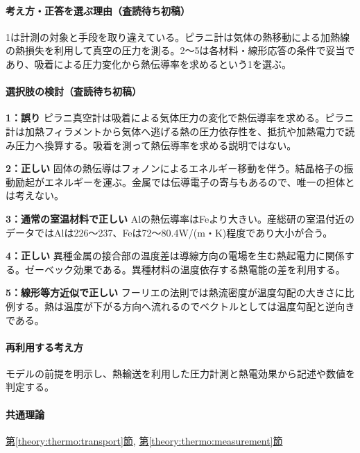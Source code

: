 \paragraph{考え方・正答を選ぶ理由（査読待ち初稿）} 1は計測の対象と手段を取り違えている。ピラニ計は気体の熱移動による加熱線の熱損失を利用して真空の圧力を測る。2〜5は各材料・線形応答の条件で妥当であり、吸着による圧力変化から熱伝導率を求めるという1を選ぶ。

\paragraph{選択肢の検討（査読待ち初稿）}\mbox{}\par

\noindent\textbf{1：誤り} ピラニ真空計は吸着による気体圧力の変化で熱伝導率を求める。ピラニ計は加熱フィラメントから気体へ逃げる熱の圧力依存性を、抵抗や加熱電力で読み圧力へ換算する。吸着を測って熱伝導率を求める説明ではない。\par

\noindent\textbf{2：正しい} 固体の熱伝導はフォノンによるエネルギー移動を伴う。結晶格子の振動励起がエネルギーを運ぶ。金属では伝導電子の寄与もあるので、唯一の担体とは考えない。\par

\noindent\textbf{3：通常の室温材料で正しい} Alの熱伝導率はFeより大きい。産総研の室温付近のデータではAlは226〜237、Feは72〜80.4W/(m・K)程度であり大小が合う。\par

\noindent\textbf{4：正しい} 異種金属の接合部の温度差は導線方向の電場を生む熱起電力に関係する。ゼーベック効果である。異種材料の温度依存する熱電能の差を利用する。\par

\noindent\textbf{5：線形等方近似で正しい} フーリエの法則では熱流密度が温度勾配の大きさに比例する。熱は温度が下がる方向へ流れるのでベクトルとしては温度勾配と逆向きである。\par

\paragraph{再利用する考え方} モデルの前提を明示し、熱輸送を利用した圧力計測と熱電効果から記述や数値を判定する。

\paragraph{共通理論} \hyperref[theory:thermo:transport]{第\ref*{theory:thermo:transport}節}, \hyperref[theory:thermo:measurement]{第\ref*{theory:thermo:measurement}節}

